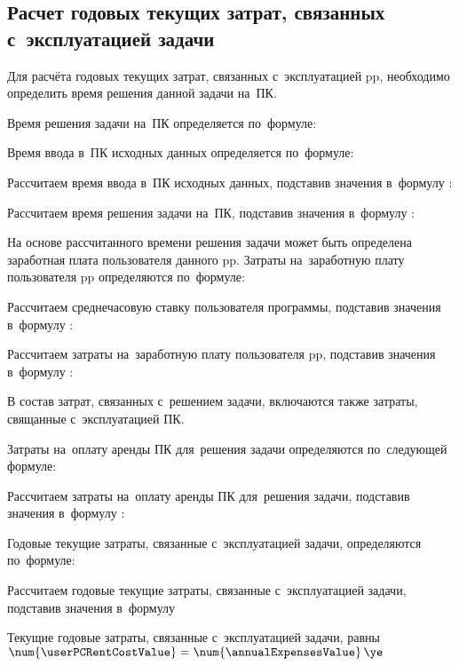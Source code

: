 \subsection{Расчет годовых текущих затрат, связанных с~эксплуатацией задачи}
\label{sec:economics:manualTotalExpenses}

Для расчёта годовых текущих затрат, связанных с~эксплуатацией \gls{pp}, необходимо определить время решения данной задачи на~ПК.

Время решения задачи на~ПК определяется по~формуле:
\pcTaskAccomplishTimeCostEquation

Время ввода в~ПК исходных данных определяется по~формуле:
\manualInputTimeEquation

Рассчитаем время ввода в~ПК исходных данных, подставив значения в~формулу :
\manualInputTimeFormulaApplied

Рассчитаем время решения задачи на~ПК, подставив значения в~формулу :
\pcTaskAccomplishTimeCostFormulaApplied

На основе рассчитанного времени решения задачи может быть определена заработная плата пользователя данного \gls{pp}. Затраты на~заработную плату пользователя \gls{pp} определяются по~формуле:
\userSalaryEquation

Рассчитаем среднечасовую ставку пользователя программы, подставив значения в~формулу :
\userRateFormulaApplied

Рассчитаем затраты на~заработную плату пользователя \gls{pp}, подставив значения в~формулу :
\userSalaryFormulaApplied

В состав затрат, связанных с~решением задачи, включаются также затраты, свящанные с~эксплуатацией ПК.

Затраты на~оплату аренды ПК для~решения задачи определяются по~следующей формуле:
\userPCRentCostEquation

Рассчитаем затраты на~оплату аренды ПК для~решения задачи, подставив значения в~формулу :
\userPCRentCostFormulaApplied

Годовые текущие затраты, связанные с~эксплуатацией задачи, определяются по~формуле:
\annualExpensesEquation

Рассчитаем годовые текущие затраты, связанные с~эксплуатацией задачи, подставив значения в~формулу 
\annualExpensesFormulaApplied

Текущие годовые затраты, связанные с~эксплуатацией задачи, равны \(\num{\userPCRentCostValue} = \num{\annualExpensesValue} \, \ye\)